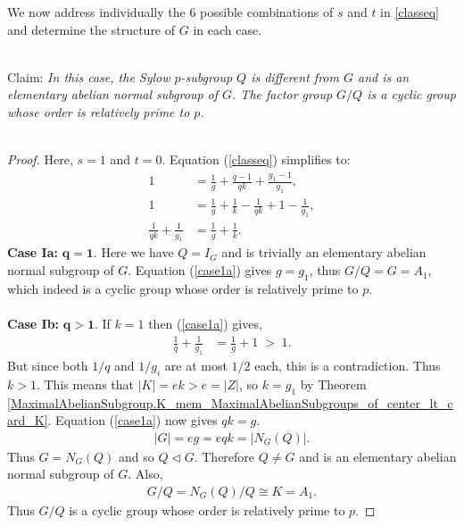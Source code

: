 We now address individually the 6 possible combinations of $s$ and $t$ in \eqref{classeq} and determine the structure of $G$ in each case. \\
\\
\begin{theorem}[Case I]
\label{case_I}
\leanok
Claim: \textit{In this case, the Sylow $p$-subgroup $Q$ is different from $G$ and is an elementary abelian normal subgroup of $G$. The factor group $G/Q$ is a cyclic group whose order is relatively prime to $p$.} \\
\\
\end{theorem}
\begin{proof} Here, $s = 1$ and $t = 0$. Equation (\ref{classeq}) simplifies to:
\begin{align}\label{case1a} 1 &= \frac{1}{g} + \frac{q-1}{qk} + \frac{g_1-1}{g_1}, \nonumber
\\ 1 &= \frac{1}{g} + \frac{1}{k} - \frac{1}{qk}  + 1 - \frac{1}{g_1}, \nonumber
\\ \frac{1}{qk}  + \frac{1}{g_1} &= \frac{1}{g} + \frac{1}{k}.
\end{align}
 \space \textbf{Case Ia:} $\pmb{q = 1}$. Here we have $Q = I_G$ and is trivially an elementary abelian normal subgroup of $G$. Equation (\ref{case1a}) gives $g=g_1$, thus $G/Q = G = A_1$, which indeed is a cyclic group whose order is relatively prime to $p$. \\
\\
 \space \textbf{Case Ib:} $\pmb{q > 1}$. If $k=1$ then (\ref{case1a}) gives,
\begin{align*} \frac{1}{q}  + \frac{1}{g_1} &= \frac{1}{g} + 1 \; > \; 1.
\end{align*}
But since both $1/q$ and $1/g_i$ are at most $1/2$ each, this is a contradiction. Thus $k > 1$. This means that $|K| = ek > e = |Z|$, so $k = g_1$ by 
Theorem \ref{MaximalAbelianSubgroup.K_mem_MaximalAbelianSubgroups_of_center_lt_card_K}. Equation (\ref{case1a}) now gives $qk = g$.
\begin{align*} |G| = eg = eqk = |N_G(Q)|.
\end{align*}
Thus $G = N_G(Q)$ and so $Q \vartriangleleft G$. Therefore $Q \neq G$ and is an elementary abelian normal subgroup of $G$. Also,
\begin{align*} G/Q = N_G(Q)/Q \cong K = A_1.
\end{align*}
Thus $G/Q$ is a cyclic group whose order is relatively prime to $p$.

\end{proof}


